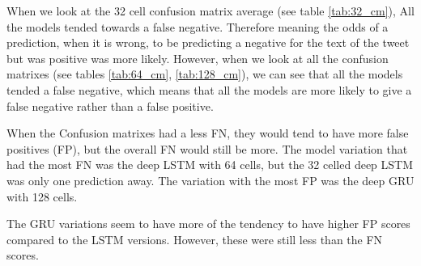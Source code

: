 \documentclass[a4paper,10pt]{article}
\newcommand\MyBox[2]{
	\fbox{\lower0.6cm
		\vbox to 0.6cm{\vfil
			\hbox to 0.9cm{\hfil\parbox{1.0cm}{#1\\#2}\hfil}
			\vfil}%
	}%
}
\begin{document}
	When we look at the 32 cell confusion matrix average (see table \ref{tab:32_cm}), All the models tended towards a false negative. Therefore meaning the odds of a prediction, when it is wrong, to be predicting a negative for the text of the tweet but was positive was more likely. However, when we look at all the confusion matrixes (see tables \ref{tab:64_cm}, \ref{tab:128_cm}), we can see that all the models tended a false negative, which means that all the models are more likely to give a false negative rather than a false positive. 
	

	


	

	When the Confusion matrixes had a less FN, they would tend to have more false positives (FP), but the overall FN would still be more. The model variation that had the most FN was the deep LSTM with 64 cells, but the 32 celled deep LSTM was only one prediction away. The variation with the most FP was the deep GRU with 128 cells.
	
	The GRU variations seem to have more of the tendency to have higher FP scores compared to the LSTM versions. However, these were still less than the FN scores.  

\end{document}
